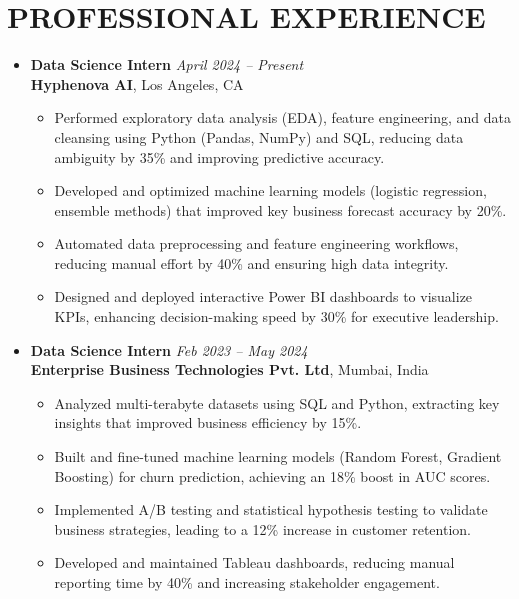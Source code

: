 \documentclass[letterpaper,11pt]{article}
\begin{document}
\section{\textbf{PROFESSIONAL EXPERIENCE}}
  \begin{itemize}[leftmargin=0.15in, label={}]

    \item \textbf{Data Science Intern} \hfill \textit{April 2024 – Present} \\
    \textbf{Hyphenova AI}, Los Angeles, CA
    \begin{itemize}
        \item Performed exploratory data analysis (EDA), feature engineering, and data cleansing using Python (Pandas, NumPy) and SQL, reducing data ambiguity by 35\% and improving predictive accuracy.
        \item Developed and optimized machine learning models (logistic regression, ensemble methods) that improved key business forecast accuracy by 20\%.
        \item Automated data preprocessing and feature engineering workflows, reducing manual effort by 40\% and ensuring high data integrity.
        \item Designed and deployed interactive Power BI dashboards to visualize KPIs, enhancing decision-making speed by 30\% for executive leadership.
    \end{itemize}

    \item \textbf{Data Science Intern} \hfill \textit{Feb 2023 – May 2024} \\
    \textbf{Enterprise Business Technologies Pvt. Ltd}, Mumbai, India
    \begin{itemize}
        \item Analyzed multi-terabyte datasets using SQL and Python, extracting key insights that improved business efficiency by 15\%.
        \item Built and fine-tuned machine learning models (Random Forest, Gradient Boosting) for churn prediction, achieving an 18\% boost in AUC scores.
        \item Implemented A/B testing and statistical hypothesis testing to validate business strategies, leading to a 12\% increase in customer retention.
        \item Developed and maintained Tableau dashboards, reducing manual reporting time by 40\% and increasing stakeholder engagement.
    \end{itemize}
  \end{itemize}
\end{document}
